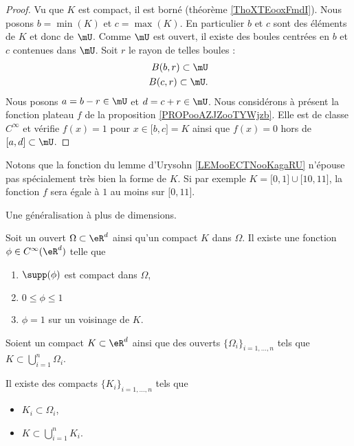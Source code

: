 \begin{proof}
    Vu que \( K\) est compact, il est borné (théorème \ref{ThoXTEooxFmdI}). Nous posons \( b=\min(K)\) et \( c=\max(K)\). En particulier \( b\) et \( c\) sont des éléments de \( K\) et donc de \( \mU\). Comme \( \mU\) est ouvert, il existe des boules centrées en \( b\) et \( c\) contenues dans \( \mU\). Soit \( r\) le rayon de telles boules :
    \begin{subequations}
        \begin{align}
            B(b,r)\subset \mU\\
            B(c,r)\subset \mU.
        \end{align}
    \end{subequations}
    Nous posons \( a=b-r\in \mU\) et \( d=c+r\in \mU\). Nous considérons à présent la fonction plateau \( f\) de la proposition \ref{PROPooAZJZooTYWjzb}. Elle est de classe \(  C^{\infty}\) et vérifie \( f(x)=1\) pour \( x\in \mathopen[ b , c \mathclose]=K\) ainsi que \( f(x)=0\) hors de \( \mathopen[ a , d \mathclose]\subset \mU\).
\end{proof}

\begin{normaltext}
    Notons que la fonction du lemme d'Urysohn \ref{LEMooECTNooKagaRU} n'épouse pas spécialement très bien la forme de \( K\). Si par exemple \( K=\mathopen[ 0 , 1 \mathclose]\cup \mathopen[ 10 , 11 \mathclose]\), la fonction \( f\) sera égale à \( 1\) au moins sur \( \mathopen[ 0 , 11 \mathclose]\).
\end{normaltext}

Une généralisation à plus de dimensions.

\begin{proposition}       \label{PROPooBOZIooAhKbPs}
    Soit un ouvert \( \Omega\subset \eR^d\) ainsi qu'un compact \( K\) dans \( \Omega\). Il existe une fonction \( \phi\in C^{\infty}(\eR^d)\) telle que
    \begin{enumerate}
        \item
            \( \supp(\phi)\) est compact dans \( \Omega\),
        \item
            \( 0\leq \phi\leq 1\)
        \item
            \( \phi=1\) sur un voisinage de \( K\).
    \end{enumerate}
\end{proposition}

\begin{lemma}     \label{LEMooWRIXooSBHavt}
    Soient un compact \( K\subset \eR^d\) ainsi que des ouverts \( \{\Omega_i\}_{i=1,\ldots, n}\) tels que \( K\subset\bigcup_{i=1}^n\Omega_i\).

    Il existe des compacts \( \{ K_i \}_{i=1,\ldots, n}\) tels que 
    \begin{itemize}
        \item 
    \( K_i\subset \Omega_i\), 
    \item
    \( K\subset\bigcup_{i=1}^nK_i\).
    \end{itemize}
\end{lemma}

